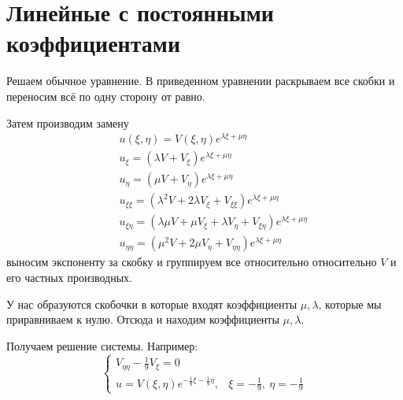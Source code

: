 \documentclass{article}[12pt]
\begin{document}
\section{Линейные с постоянными коэффициентами}
Решаем обычное уравнение. В приведенном уравнении раскрываем все скобки и
переносим всё по одну сторону от равно.
\par Затем производим замену
\begin{eqnarray*}
    &&u(\xi,\eta)=V(\xi,\eta)e^{\lambda\xi+\mu\eta}
    \\&&u_{\xi}=(\lambda V+V_{\xi})e^{\lambda\xi+\mu\eta}
    \\&&u_{\eta}=(\mu V+V_{\eta})e^{\lambda\xi+\mu\eta}
    \\&&u_{\xi\xi}=(\lambda^{2}V+2\lambda
    V_{\xi}+V_{\xi\xi})e^{\lambda\xi+\mu\eta}
    \\&&u_{\xi\eta}=(\lambda\mu V+\mu V_{\xi}+\lambda
    V_{\eta}+V_{\xi\eta})e^{\lambda\xi+\mu\eta}
    \\&&u_{\eta\eta}=(\mu^{2}V+2\mu
    V_{\eta}+V_{\eta\eta})e^{\lambda\xi+\mu\eta}
\end{eqnarray*}
выносим экспоненту за скобку и группируем все относительно относительно
$V$ и его частных производных.
\par У нас образуются скобочки в которые входят коэффициенты
$\mu,\lambda$, которые мы приравниваем к нулю. Отсюда и находим
коэффициенты $\mu,\lambda$.
\par Получаем решение системы. Например:
\begin{displaymath}
    \left\{\begin{array}{ll}
            V_{\eta\eta}-\frac{1}{9}V_{\xi}=0
            \\u=V(\xi,\eta)e^{-\frac{1}{9}\xi -\frac{1}{9}\eta},
            & \xi=-\frac{1}{9},\ \eta=-\frac{1}{9}
    \end{array}\right.
\end{displaymath}
\end{document}
